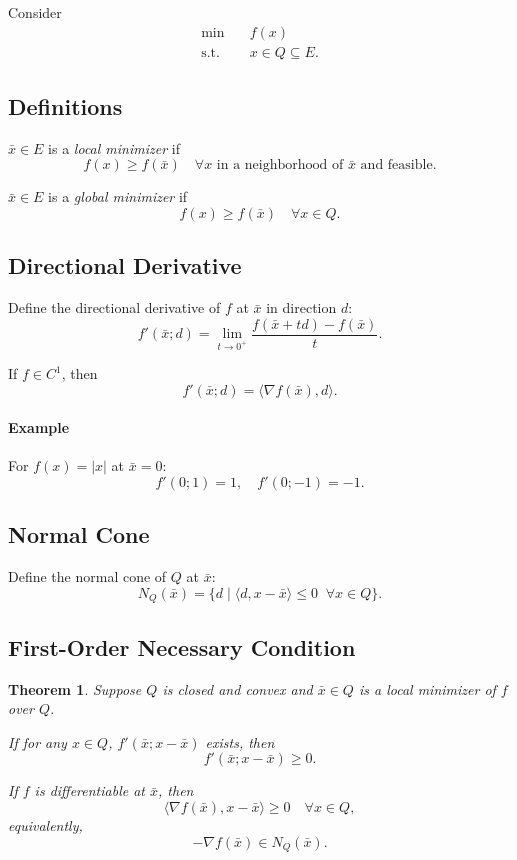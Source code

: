 \documentclass[12pt,oneside]{book}
\numberwithin{equation}{section}
\theoremstyle{definition}
\theoremstyle{plain}
\newtheorem{theorem}{Theorem}[section]
\theoremstyle{remark}
\begin{document}
Consider
\[
\begin{aligned}
\min \quad & f(x) \\
\text{s.t.} \quad & x \in Q \subseteq E.
\end{aligned}
\]

\subsection*{Definitions}

$\bar{x} \in E$ is a \emph{local minimizer} if
\[
f(x) \ge f(\bar{x}) \quad \forall x \text{ in a neighborhood of } \bar{x} \text{ and feasible}.
\]

$\bar{x} \in E$ is a \emph{global minimizer} if
\[
f(x) \ge f(\bar{x}) \quad \forall x \in Q.
\]

\subsection*{Directional Derivative}

Define the directional derivative of $f$ at $\bar{x}$ in direction $d$:
\[
f'(\bar{x}; d)
=
\lim_{t \to 0^+}
\frac{f(\bar{x} + t d) - f(\bar{x})}{t}.
\]

If $f \in C^1$, then
\[
f'(\bar{x}; d) = \langle \nabla f(\bar{x}), d \rangle.
\]

\paragraph{Example}
For $f(x) = |x|$ at $\bar{x} = 0$:
\[
f'(0;1) = 1, \quad f'(0;-1) = -1.
\]

\subsection*{Normal Cone}

Define the normal cone of $Q$ at $\bar{x}$:
\[
N_Q(\bar{x})
=
\{ d \mid \langle d, x - \bar{x} \rangle \le 0 \;\; \forall x \in Q \}.
\]

\subsection{First-Order Necessary Condition}

\begin{theorem}
Suppose $Q$ is closed and convex and $\bar{x} \in Q$ is a local minimizer of $f$ over $Q$.

If for any $x \in Q$, $f'(\bar{x}; x - \bar{x})$ exists, then
\[
f'(\bar{x}; x - \bar{x}) \ge 0.
\]

If $f$ is differentiable at $\bar{x}$, then
\[
\langle \nabla f(\bar{x}), x - \bar{x} \rangle \ge 0 \quad \forall x \in Q,
\]
equivalently,
\[
-\nabla f(\bar{x}) \in N_Q(\bar{x}).
\]
\end{theorem}
\end{document}
